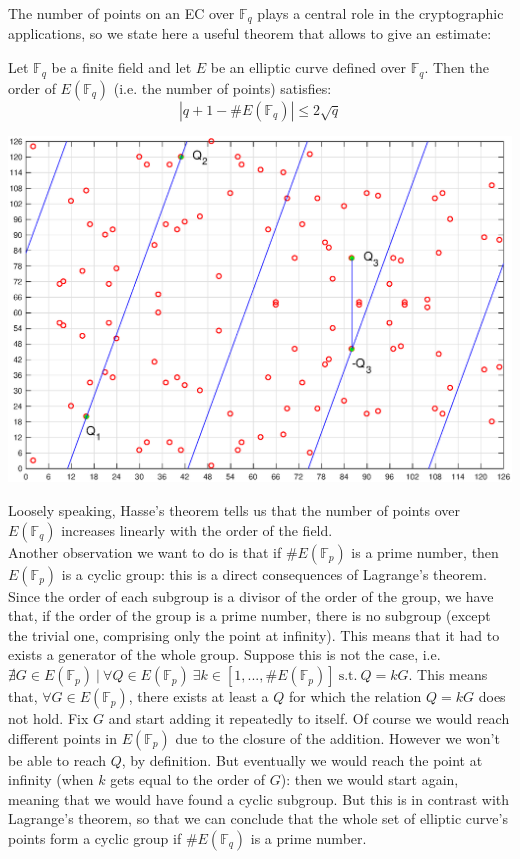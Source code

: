 \bigskip
\noindent
The number of points on an EC over $\mathbb{F}_q$ plays a central role in the cryptographic applications, so we state here a useful theorem that allows to give an estimate:
\begin{thm}  Let $\mathbb{F}_q$ be a finite field and let $E$ be an elliptic curve defined over $\mathbb{F}_q$. Then the order of $E(\mathbb{F}_q)$ (i.e. the number of points) satisfies: $$|q + 1 - \#E(\mathbb{F}_q)| \leq 2\sqrt{q}$$
\end{thm}
\begin{center}
	\includegraphics[width=0.9\linewidth]{Images/sum_ec_over_ff.eps}
	\label{fig:figure5}
\end{center}
\noindent
Loosely speaking, Hasse's theorem tells us that the number of points over $E(\mathbb{F}_q)$ increases linearly with the order of the field.
\\
Another observation we want to do is that if $\#E(\mathbb{F}_p)$ is a prime number, then $E(\mathbb{F}_p)$ is a cyclic group: this is a direct consequences of Lagrange's theorem. Since the order of each subgroup is a divisor of the order of the group, we have that, if the order of the group is a prime number, there is no subgroup (except the trivial one, comprising only the point at infinity). This means that it had to exists a generator of the whole group. Suppose this is not the case, i.e. $\nexists G \in E(\mathbb{F}_p) \ | \ \forall Q \in E(\mathbb{F}_p) \ \exists k \in [1, ..., \#E(\mathbb{F}_p)] \ \text{s.t.} \ Q = kG$. This means that, $\forall G \in E(\mathbb{F}_p)$, there exists at least a $Q$ for which the relation $Q = kG$ does not hold. Fix $G$ and start adding it repeatedly to itself. Of course we would reach different points in $E(\mathbb{F}_p)$ due to the closure of the addition. However we won't be able to reach $Q$, by definition. But eventually we would reach the point at infinity (when $k$ gets equal to the order of $G$): then we would start again, meaning that we would have found a cyclic subgroup. But this is in contrast with Lagrange's theorem, so that we can conclude that the whole set of elliptic curve's points form a cyclic group if $\#E(\mathbb{F}_q)$ is a prime number.

